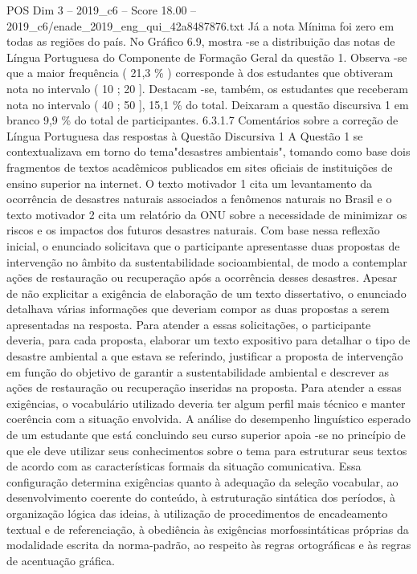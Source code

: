 \begin{textsample}{POS Dim 3 – 2019\_c6 – Score 18.00 – 2019\_c6/enade\_2019\_eng\_qui\_42a8487876.txt}
Já a nota Mínima foi zero em todas as regiões do país.
No Gráfico 6.9, mostra -se a distribuição das notas de Língua Portuguesa do Componente de Formação Geral da questão 1.
Observa -se que a maior frequência ( 21,3 \% ) corresponde à dos estudantes que obtiveram nota no intervalo ( 10 ; 20 ].
Destacam -se, também, os estudantes que receberam nota no intervalo ( 40 ; 50 ], 15,1 \% do total.
Deixaram a questão discursiva 1 em branco 9,9 \% do total de participantes. 6.3.1.7 Comentários sobre a correção de Língua Portuguesa das respostas à Questão Discursiva 1 A Questão 1 se contextualizava em torno do tema"desastres ambientais", tomando como base dois fragmentos de textos acadêmicos publicados em sites oficiais de instituições de ensino superior na internet.
O texto motivador 1 cita um levantamento da ocorrência de desastres naturais associados a fenômenos naturais no Brasil e o texto motivador 2 cita um relatório da ONU sobre a necessidade de minimizar os riscos e os impactos dos futuros desastres naturais.
Com base nessa reflexão inicial, o enunciado solicitava que o participante apresentasse duas propostas de intervenção no âmbito da sustentabilidade socioambiental, de modo a contemplar ações de restauração ou recuperação após a ocorrência desses desastres.
Apesar de não explicitar a exigência de elaboração de um texto dissertativo, o enunciado detalhava várias informações que deveriam compor as duas propostas a serem apresentadas na resposta.
Para atender a essas solicitações, o participante deveria, para cada proposta, elaborar um texto expositivo para detalhar o tipo de desastre ambiental a que estava se referindo, justificar a proposta de intervenção em função do objetivo de garantir a sustentabilidade ambiental e descrever as ações de restauração ou recuperação inseridas na proposta.
Para atender a essas exigências, o vocabulário utilizado deveria ter algum perfil mais técnico e manter coerência com a situação envolvida.
A análise do desempenho linguístico esperado de um estudante que está concluindo seu curso superior apoia -se no princípio de que ele deve utilizar seus conhecimentos sobre o tema para estruturar seus textos de acordo com as características formais da situação comunicativa.
Essa configuração determina exigências quanto à adequação da seleção vocabular, ao desenvolvimento coerente do conteúdo, à estruturação sintática dos períodos, à organização lógica das ideias, à utilização de procedimentos de encadeamento textual e de referenciação, à obediência às exigências morfossintáticas próprias da modalidade escrita da norma-padrão, ao respeito às regras ortográficas e às regras de acentuação gráfica.

\end{textsample}
